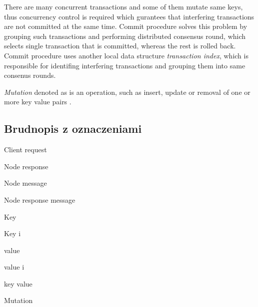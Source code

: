 There are many concurrent transactions and some of them mutate same keys, thus concurrency control is required which gurantees that interfering transactions are not committed at the same time. Commit procedure solves this problem by grouping such transactions and performing distributed consensus round, which selects single transaction that is committed, whereas the rest is rolled back.
Commit procedure uses another local data structure \emph{transaction index}, which is responsible for identifing interfering transactions and grouping them into same consenus rounds.

\begin{definition}
  \label{def:mutation}
  \emph{Mutation} denoted as  is an operation, such as insert, update or removal of one or more key value pairs \kv.
\end{definition}


\subsection{Brudnopis z oznaczeniami}

Client request 

Node response 

Node message 

Node response message 

Key \key

Key i 

value \kvalue

value i 

key value \kv

Mutation 
